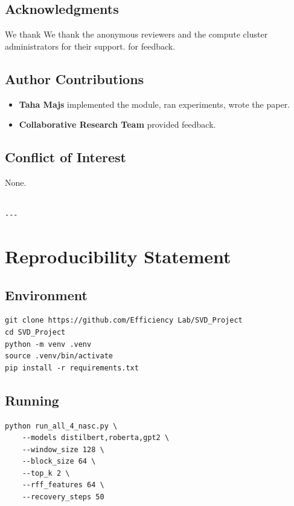 \subsection{Acknowledgments}

We thank We thank the anonymous reviewers and the compute cluster administrators for their support. for feedback.

\subsection{Author Contributions}

\begin{itemize}
\item \textbf{Taha Majs} implemented the module, ran experiments, wrote the paper.
\item \textbf{Collaborative Research Team} provided feedback.

\end{itemize}
\subsection{Conflict of Interest}

None.
\begin{lstlisting}

---
\end{lstlisting}


\section{Reproducibility Statement}

\subsection{Environment}

\begin{lstlisting}
git clone https://github.com/Efficiency Lab/SVD_Project
cd SVD_Project
python -m venv .venv
source .venv/bin/activate
pip install -r requirements.txt
\end{lstlisting}

\subsection{Running}

\begin{lstlisting}
python run_all_4_nasc.py \
    --models distilbert,roberta,gpt2 \
    --window_size 128 \
    --block_size 64 \
    --top_k 2 \
    --rff_features 64 \
    --recovery_steps 50
\end{lstlisting}

